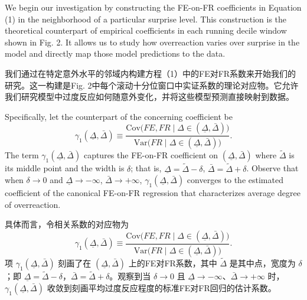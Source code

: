 \documentclass[12pt,a4paper]{article}
\newenvironment{original}
  {\par\medskip\noindent\ignorespaces}
  {\par\medskip}
\newenvironment{translation}
  {\par\noindent{\color{transblue}\ignorespaces}}
  {\par\bigskip}
\begin{document}
\begin{original}
We begin our investigation by constructing the FE-on-FR coefficients in Equation (1) in the neighborhood of a particular surprise level. This construction is the theoretical counterpart of empirical coefficients in each running decile window shown in Fig. 2. It allows us to study how overreaction varies over surprise in the model and directly map those model predictions to the data.
\end{original}
\begin{translation}
我们通过在特定意外水平的邻域内构建方程（1）中的FE对FR系数来开始我们的研究。这一构建是Fig. 2中每个滚动十分位窗口中实证系数的理论对应物。它允许我们研究模型中过度反应如何随意外变化，并将这些模型预测直接映射到数据。
\end{translation}

\begin{original}
Specifically, let the counterpart of the concerning coefficient be
\[
\gamma_1(\underline{\Delta}, \bar{\Delta}) \equiv \frac{\text{Cov}\big(FE, FR \mid \Delta \in (\underline{\Delta}, \bar{\Delta})\big)}{\text{Var}\big(FR \mid \Delta \in (\underline{\Delta}, \bar{\Delta})\big)}.
\]
The term $\gamma_1(\underline{\Delta}, \bar{\Delta})$ captures the FE-on-FR coefficient on $(\underline{\Delta}, \bar{\Delta})$ where $\tilde{\Delta}$ is its middle point and the width is $\delta$; that is, $\underline{\Delta} = \tilde{\Delta} - \delta$, $\bar{\Delta} = \tilde{\Delta} + \delta$. Observe that when $\delta \to 0$ and $\underline{\Delta} \to -\infty$, $\bar{\Delta} \to +\infty$, $\gamma_1(\underline{\Delta}, \bar{\Delta})$ converges to the estimated coefficient of the canonical FE-on-FR regression that characterizes average degree of overreaction.
\end{original}
\begin{translation}
具体而言，令相关系数的对应物为
\[
\gamma_1(\underline{\Delta}, \bar{\Delta}) \equiv \frac{\text{Cov}\big(FE, FR \mid \Delta \in (\underline{\Delta}, \bar{\Delta})\big)}{\text{Var}\big(FR \mid \Delta \in (\underline{\Delta}, \bar{\Delta})\big)}.
\]
项 $\gamma_1(\underline{\Delta}, \bar{\Delta})$ 刻画了在 $(\underline{\Delta}, \bar{\Delta})$ 上的FE对FR系数，其中 $\tilde{\Delta}$ 是其中点，宽度为 $\delta$；即 $\underline{\Delta} = \tilde{\Delta} - \delta$，$\bar{\Delta} = \tilde{\Delta} + \delta$。观察到当 $\delta \to 0$ 且 $\underline{\Delta} \to -\infty$、$\bar{\Delta} \to +\infty$ 时，$\gamma_1(\underline{\Delta}, \bar{\Delta})$ 收敛到刻画平均过度反应程度的标准FE对FR回归的估计系数。
\end{translation}
\end{document}

